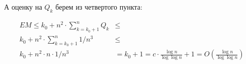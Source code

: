 \documentclass[russian]{article}
\begin{document}
А оценку на $Q_k$ берем из четвертого пункта:

\begin{align*}
EM \leqslant k_0 + n^2 \cdot \sum_{k=k_0 + 1}^{n}{Q_k} & \leqslant \\
k_0 + n^2 \cdot \sum_{k=k_0 + 1}^{n}{1/n^3} & \leqslant \\
k_0 + n^2 \cdot n \cdot 1/n^3 & = k_0 + 1= c \cdot \frac{\log n}{\log \log n} + 1 = 
O\left(\frac{\log n}{\log \log n}\right)
\end{align*}
\end{document}
